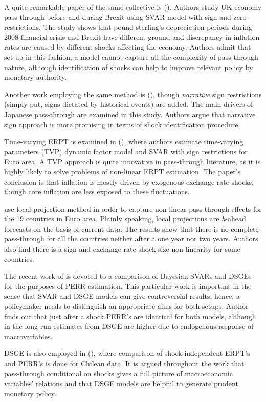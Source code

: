 \documentclass[12pt, a4paper]{extarticle}
\begin{document}
A quite remarkable paper of the same collective is (\cite{Forbes2018}). Authors study UK economy pass-through before and during Brexit using SVAR model with sign and zero restrictions. The study shows that pound-sterling's depreciation periods during 2008 financial crisis and Brexit have different ground and discrepancy in inflation rates are caused by different shocks affecting the economy. Authors admit that set up in this fashion, a model cannot capture all the complexity of pass-through nature, although identification of shocks can help to improve relevant policy by monetary authority.

Another work employing the same method is (\cite{An2020}), though \textit{narrative} sign restrictions (simply put, signs dictated by historical events) are added. The main drivers of Japanese pass-through are examined in this study. Authors argue that narrative sign approach is more promising in terms of shock identification procedure.

Time-varying ERPT is examined in (\cite{LeivaLeon2019}), where authors estimate time-varying parameters (TVP) dynamic factor model and SVAR with sign restrictions for Euro area. A TVP approach is quite innovative in pass-through literature, as it is highly likely to solve problems of non-linear ERPT estimation. The paper's conclusion is that inflation is mostly driven by exogenous exchange rate shocks, though core inflation are less exposed to these fluctuations.

\textcite{Colavecchio2019} use local projection method in order to capture non-linear pass-through effects for the 19 countries in Euro area. Plainly speaking, local projections are \textit{h}-ahead forecasts on the basis of current data. The results show that there is no complete pass-through for all the countries neither after a one year nor two years. Authors also find there is a sign and exchange rate shock size non-linearity for some countries.

The recent work of \textcite{Comunale2020} is devoted to a comparison of Bayesian SVARs and DSGEs for the purposes of PERR estimation. This particular work is important in the sense that SVAR and DSGE models can give controversial results; hence, a policymaker needs to distinguish an appropriate aims for both setups. Author finds out that just after a shock PERR's are identical for both models, although in the long-run estimates from DSGE are higher due to endogenous response of macrovariables. 

DSGE is also employed in (\cite{GarciaCicco2020}), where comparison of shock-independent ERPT's and PERR's is done for Chilean data. It is argued throughout the work that pass-through conditional on shocks gives a full picture of macroeconomic variables' relations and that DSGE models are helpful to generate prudent monetary policy. 
\end{document}
